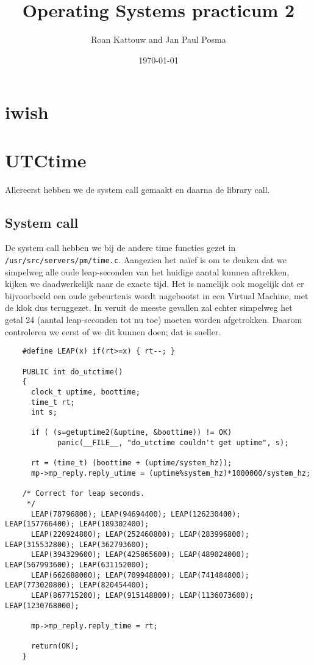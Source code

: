 \documentclass[11pt]{article}
\begin{document}
\author{Roan Kattouw and Jan Paul Posma}
\date{\today}
\title{Operating Systems practicum 2}

\maketitle

\section*{iwish}

\section*{UTCtime}
Allereerst hebben we de system call gemaakt en daarna de library call.

\subsection*{System call}
De system call hebben we bij de andere time functies gezet in \verb+/usr/src/servers/pm/time.c+.
Aangezien het na\"ief is om te denken dat we simpelweg alle oude leap-seconden van het huidige
aantal kunnen aftrekken, kijken we daadwerkelijk naar de exacte tijd. Het is namelijk ook mogelijk
dat er bijvoorbeeld een oude gebeurtenis wordt nagebootst in een Virtual Machine, met de klok
dus teruggezet. In veruit de meeste gevallen zal echter simpelweg het getal 24 (aantal leap-seconden tot
nu toe) moeten worden afgetrokken. Daarom controleren we eerst of we dit kunnen doen; dat is sneller.

\begin{verbatim}
	#define LEAP(x) if(rt>=x) { rt--; }

	PUBLIC int do_utctime()
	{
	  clock_t uptime, boottime;
	  time_t rt;
	  int s;
	
	  if ( (s=getuptime2(&uptime, &boottime)) != OK)
			panic(__FILE__, "do_utctime couldn't get uptime", s);
	
	  rt = (time_t) (boottime + (uptime/system_hz));
	  mp->mp_reply.reply_utime = (uptime%system_hz)*1000000/system_hz;
	  
	/* Correct for leap seconds.
	 */
	  LEAP(78796800); LEAP(94694400); LEAP(126230400); LEAP(157766400); LEAP(189302400);
	  LEAP(220924800); LEAP(252460800); LEAP(283996800); LEAP(315532800); LEAP(362793600); 
	  LEAP(394329600); LEAP(425865600); LEAP(489024000); LEAP(567993600); LEAP(631152000); 
	  LEAP(662688000); LEAP(709948800); LEAP(741484800); LEAP(773020800); LEAP(820454400); 
	  LEAP(867715200); LEAP(915148800); LEAP(1136073600); LEAP(1230768000);
	  
	  mp->mp_reply.reply_time = rt;
	  
	  return(OK);
	}
\end{verbatim}
\end{document}
